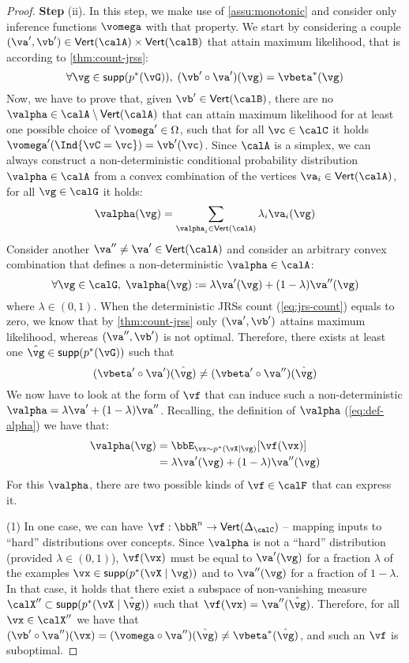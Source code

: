 \begin{proof}
    \textbf{Step} (ii). In this step, we make use of \cref{assu:monotonic} and consider only inference functions $\vomega$ with that property. 
    We start by considering a couple $(\va' , \vb') \in \Vset{\calA} \times \Vset{\calB}$ that attain maximum likelihood, that is according to \cref{thm:count-jrss}:
    \[
        \forall \vg \in \mathsf{supp} (p^*(\vG)), \; (\vb' \circ \va') (\vg) = \vbeta^* (\vg)
    \]
    Now, we have to prove that, given $\vb' \in \Vset{\calB}$,
    there are no $\valpha \in \calA \setminus \Vset{\calA}$ that can attain maximum likelihood
    for at least one possible choice of $\vomega' \in \Omega$,
    such that for all $\vc \in \calC$ it holds $\vomega'( \Ind{\vC = \vc} ) = \vb'(\vc)$. 
    Since $\calA$ is a simplex, we can always construct a non-deterministic conditional probability distribution $\valpha \in \calA$ from a convex combination of the vertices $\va_i \in \Vset{\calA}$, \ie for all $\vg \in \calG$ it holds:
    \[
        \valpha( \vg ) = \sum_{\valpha_i \in \Vset{\calA}} \lambda_i \va_i (\vg)
    \]
    Consider another $\va'' \neq \va' \in \Vset{\calA}$ and consider an arbitrary convex combination that defines a non-deterministic $\valpha \in \calA$:
    \[
    \label{eq:alpha-convex}
        \forall \vg \in \calG, \; \valpha (\vg) := \lambda \va'(\vg) + (1- \lambda) \va'' (\vg)
    \]
    where $\lambda \in (0,1)$. 
    When the deterministic JRSs count (\cref{eq:jrs-count}) equals to zero, we know that by \cref{thm:count-jrss} only $(\va', \vb')$ attains maximum likelihood, whereas $(\va'', \vb')$ is not optimal. 
    Therefore, there exists at least one $\hat \vg \in \mathsf{supp} (p^*(\vG)) $ such that
    \[
        (\vbeta' \circ \va')(\hat \vg) \neq (\vbeta' \circ \va'') (\hat \vg)
    \]
    We now have to look at the form of $\vf$ that can induce such a non-deterministic $\valpha = \lambda \va' + (1-\lambda) \va''$. 
    Recalling, the definition of $\valpha$  (\cref{eq:def-alpha}) we have that:
    \begin{align}
        \valpha (\vg) 
        &= \bbE_{\vx \sim p^*(\vX \mid \vg)} [ \vf(\vx) ]  \\
        &=  \lambda \va'(\vg) + (1-\lambda) \va'' (\vg)
    \end{align}
    For this $\valpha$, there are two possible kinds of $\vf \in \calF$ that can express it.

    (1) In one case, we can have $\vf: \bbR^n \to \Vset{\Delta_\calC}$ -- mapping inputs to ``hard'' distributions over concepts.  Since $\valpha$ is not a ``hard'' distribution (provided $\lambda \in (0, 1)$), $\vf(\vx)$ must be equal to $ \va'(\vg)$ for a fraction $\lambda$ of the examples $\vx \in \mathsf{supp} ( p^*(\vX \mid \vg ) )$ and to $\va''(\vg)$  for a fraction of $1-\lambda$. %
    In that case, it holds that there exist a subspace of non-vanishing measure $\calX'' \subset \mathsf{supp} ( p^*(\vX \mid \hat \vg) )$ such that $\vf(\vx) = \va''(\hat \vg)$. Therefore,
    for all $\vx \in \calX''$ we have that
    $ (\vb' \circ \va'')(\vx) =
    (\vomega \circ \va'')(\hat \vg) \neq \vbeta^*(\hat \vg)$, and such an $\vf$ is suboptimal.


\end{proof}
